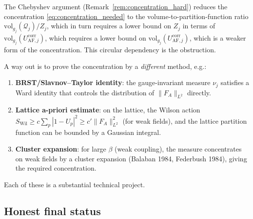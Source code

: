 \begin{remark}
\label{rem:circular}
The Chebyshev argument (Remark~\ref{rem:concentration_hard}) reduces
the concentration \eqref{eq:concentration_needed} to the
volume-to-partition-function ratio
$\mathrm{vol}_{g_{j}}(\mathcal{Q}_{j})/Z_{j}$, which in turn
requires a lower bound on $Z_{j}$ in terms of
$\mathrm{vol}_{g_{j}}(U_{\mathrm{AF},j}^{\mathrm{corr}})$, which
requires a lower bound on
$\mathrm{vol}_{g_{j}}(U_{\mathrm{AF},j}^{\mathrm{corr}})$, which
is a weaker form of the concentration. This circular dependency
is the obstruction.

A way out is to prove the concentration by a \emph{different}
method, e.g.:
\begin{enumerate}
\item \textbf{BRST/Slavnov--Taylor identity}: the gauge-invariant
measure $\nu_{j}$ satisfies a Ward identity that controls the
distribution of $\|F_{A}\|_{L^{2}}$ directly.
\item \textbf{Lattice a-priori estimate}: on the lattice, the
Wilson action $S_{\mathrm{Wil}}\ge c\sum_{p}|1-U_{p}|^{2}\ge
c'\|F_{A}\|_{L^{2}}^{2}$ (for weak fields), and the lattice
partition function can be bounded by a Gaussian integral.
\item \textbf{Cluster expansion}: for large $\beta$ (weak coupling),
the measure concentrates on weak fields by a cluster expansion
(Balaban 1984, Federbush 1984), giving the required
concentration.
\end{enumerate}
Each of these is a substantial technical project.
\end{remark}

\subsection{Honest final status}
\label{ssec:app230_status}

